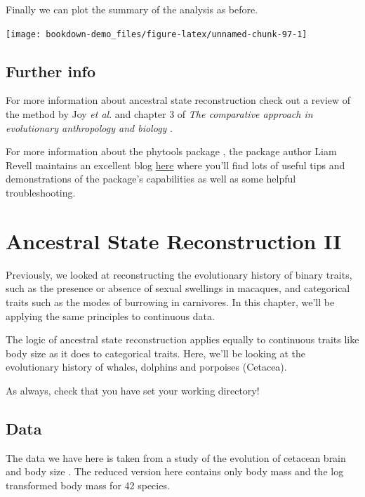 \documentclass[
]{book}
\begin{document}
Finally we can plot the summary of the analysis as before.

\begin{center}\texttt{[image: bookdown-demo\_files/figure-latex/unnamed-chunk-97-1]} \end{center}

\hypertarget{further-info-2}{%
\section{Further info}\label{further-info-2}}

For more information about ancestral state reconstruction check out a review of the method by Joy \emph{et al}. \citep{Joy16} and chapter 3 of \emph{The comparative approach in evolutionary anthropology and biology} \citep{Nunn11}.

For more information about the phytools package \citep{phytools}, the package author Liam Revell maintains an excellent blog \href{http://blog.phytools.org/}{here} where you'll find lots of useful tips and demonstrations of the package's capabilities as well as some helpful troubleshooting.

\hypertarget{asr2}{%
\chapter{Ancestral State Reconstruction II}\label{asr2}}

Previously, we looked at reconstructing the evolutionary history of binary traits, such as the presence or absence of sexual swellings in macaques, and categorical traits such as the modes of burrowing in carnivores. In this chapter, we'll be applying the same principles to continuous data.

The logic of ancestral state reconstruction applies equally to continuous traits like body size as it does to categorical traits. Here, we'll be looking at the evolutionary history of whales, dolphins and porpoises (Cetacea).

As always, check that you have set your working directory!

\hypertarget{data-2}{%
\section{Data}\label{data-2}}

The data we have here is taken from a study of the evolution of cetacean brain and body size \citep{Montgomery13}. The reduced version here contains only body mass and the log transformed body mass for 42 species.
\end{document}

